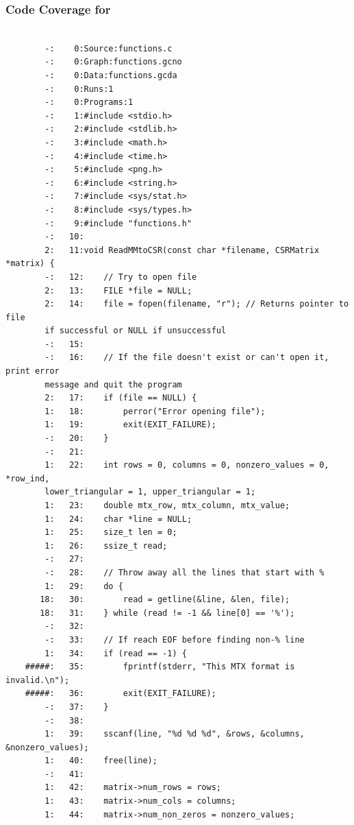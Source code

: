 \documentclass[12pt]{article}
\begin{document}
 \subsubsection{Code Coverage for }

 	\begin{mdframed}[style=myboxstyleTerminal1]
		\begin{verbatim}

        -:    0:Source:functions.c
        -:    0:Graph:functions.gcno
        -:    0:Data:functions.gcda
        -:    0:Runs:1
        -:    0:Programs:1
        -:    1:#include <stdio.h>
        -:    2:#include <stdlib.h>
        -:    3:#include <math.h>
        -:    4:#include <time.h>
        -:    5:#include <png.h>
        -:    6:#include <string.h>
        -:    7:#include <sys/stat.h>
        -:    8:#include <sys/types.h>
        -:    9:#include "functions.h"
        -:   10:
        2:   11:void ReadMMtoCSR(const char *filename, CSRMatrix *matrix) {
        -:   12:    // Try to open file
        2:   13:    FILE *file = NULL;
        2:   14:    file = fopen(filename, "r"); // Returns pointer to file 
        if successful or NULL if unsuccessful
        -:   15:
        -:   16:    // If the file doesn't exist or can't open it, print error 
        message and quit the program
        2:   17:    if (file == NULL) {
        1:   18:        perror("Error opening file");
        1:   19:        exit(EXIT_FAILURE);
        -:   20:    }
        -:   21:
        1:   22:    int rows = 0, columns = 0, nonzero_values = 0, *row_ind, 
        lower_triangular = 1, upper_triangular = 1;
        1:   23:    double mtx_row, mtx_column, mtx_value;
        1:   24:    char *line = NULL;
        1:   25:    size_t len = 0;
        1:   26:    ssize_t read;
        -:   27:
        -:   28:    // Throw away all the lines that start with %
        1:   29:    do {
       18:   30:        read = getline(&line, &len, file);
       18:   31:    } while (read != -1 && line[0] == '%');
        -:   32:
        -:   33:    // If reach EOF before finding non-% line
        1:   34:    if (read == -1) {
    #####:   35:        fprintf(stderr, "This MTX format is invalid.\n");
    #####:   36:        exit(EXIT_FAILURE);
        -:   37:    }
        -:   38:
        1:   39:    sscanf(line, "%d %d %d", &rows, &columns, &nonzero_values);
        1:   40:    free(line);
        -:   41:
        1:   42:    matrix->num_rows = rows;
        1:   43:    matrix->num_cols = columns;
        1:   44:    matrix->num_non_zeros = nonzero_values;

\end{verbatim}
\end{mdframed}
\end{document}

